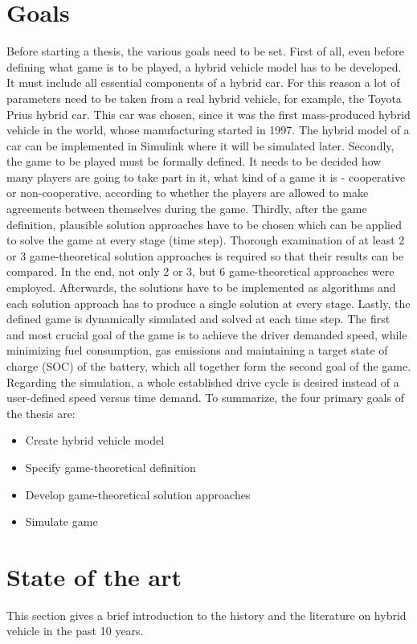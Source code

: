 \section{Goals}
Before starting a thesis, the various goals need to be set. First of all, even before defining what game is to be played, a hybrid vehicle model has to be developed. It must include all essential components of a hybrid car. For this reason a lot of parameters need to be taken from a real hybrid vehicle, for example, the Toyota Prius hybrid car. This car was chosen, since it was the first mass-produced hybrid vehicle in the world, whose manufacturing started in 1997. The hybrid model of a car can be implemented in Simulink where it will be simulated later. Secondly, the game to be played must be formally defined. It needs to be decided how many players are going to take part in it, what kind of a game it is - cooperative or non-cooperative, according to whether the players are allowed to make agreements between themselves during the game. Thirdly, after the game definition, plausible solution approaches have to be chosen which can be applied to solve the game at every stage (time step). Thorough examination of at least 2 or 3 game-theoretical solution approaches is required so that their results can be compared. In the end, not only 2 or 3, but 6 game-theoretical approaches were employed. Afterwards, the solutions have to be implemented as algorithms and each solution approach has to produce a single solution at every stage. Lastly, the defined game is dynamically simulated and solved at each time step. The first and most crucial goal of the game is to achieve the driver demanded speed, while minimizing fuel consumption, gas emissions and maintaining a target state of charge (SOC) of the battery, which all together form the second goal of the game. Regarding the simulation, a whole established drive cycle is desired instead of a user-defined speed versus time demand. To summarize, the four primary goals of the thesis are:

\begin{itemize}
\item Create hybrid vehicle model
\item Specify game-theoretical definition
\item Develop game-theoretical solution approaches
\item Simulate game
\end{itemize}


\section{State of the art} 
\label{sec:stateart}
This section gives a brief introduction to the history and the literature on hybrid vehicle in the past 10 years.

